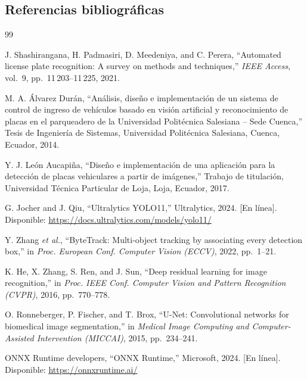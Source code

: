 \documentclass[11pt]{article}
\begin{document}
\subsection{Referencias bibliográficas}
{
    \renewcommand{\refname}{}
    \vspace{-1.5em}
    \begin{thebibliography}{99}

    J. Shashirangana, H. Padmasiri, D. Meedeniya, and C. Perera, ``Automated license
    plate recognition: A survey on methods and techniques,'' \emph{IEEE Access},
    vol.~9, pp.~11\,203--11\,225, 2021.

    M. A. Álvarez Durán, ``Análisis, diseño e implementación de un sistema de control
    de ingreso de vehículos basado en visión artificial y reconocimiento de placas en
    el parqueadero de la Universidad Politécnica Salesiana -- Sede Cuenca,'' Tesis de
    Ingeniería de Sistemas, Universidad Politécnica Salesiana, Cuenca, Ecuador, 2014.

    Y. J. León Aucapiña, ``Diseño e implementación de una aplicación para la detección
    de placas vehiculares a partir de imágenes,'' Trabajo de titulación, Universidad
    Técnica Particular de Loja, Loja, Ecuador, 2017.

    G. Jocher and J. Qiu, ``Ultralytics YOLO11,'' Ultralytics, 2024. [En línea].
    Disponible: \url{https://docs.ultralytics.com/models/yolo11/}

    Y. Zhang \emph{et al.}, ``ByteTrack: Multi-object tracking by associating every
    detection box,'' in \emph{Proc. European Conf. Computer Vision (ECCV)}, 2022,
    pp.~1--21.

    K. He, X. Zhang, S. Ren, and J. Sun, ``Deep residual learning for image
    recognition,'' in \emph{Proc. IEEE Conf. Computer Vision and Pattern Recognition
    (CVPR)}, 2016, pp.~770--778.

    O. Ronneberger, P. Fischer, and T. Brox, ``U-Net: Convolutional networks for
    biomedical image segmentation,'' in \emph{Medical Image Computing and
    Computer-Assisted Intervention (MICCAI)}, 2015, pp.~234--241.

    ONNX Runtime developers, ``ONNX Runtime,'' Microsoft, 2024. [En línea]. Disponible:
    \url{https://onnxruntime.ai/}


\end{thebibliography}}
\end{document}
